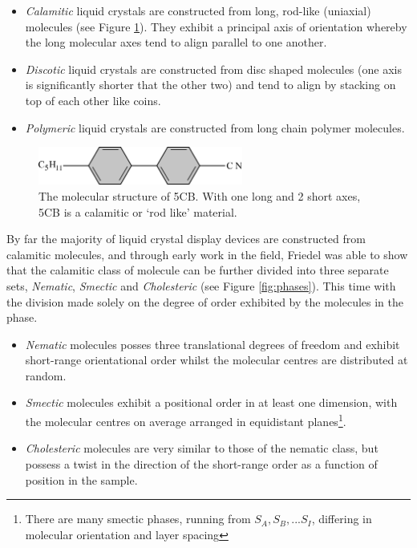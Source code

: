 \begin{itemize}
\item \textit{Calamitic} liquid crystals are constructed from long, rod-like (uniaxial) molecules (see Figure \ref{fig:5cb_molecule}). They exhibit a principal axis of orientation whereby the long molecular axes tend to align parallel to one another.
\item \textit{Discotic} liquid crystals are constructed from disc shaped molecules (one axis is significantly shorter that the other two) and tend to align by stacking on top of each other like coins.
\item \textit{Polymeric} liquid crystals are constructed from long chain polymer molecules.
\end{itemize}

\begin{figure}
\begin{center}
\includegraphics[width=0.6\textwidth]{figures/introduction/5CB_molecule.pdf}
\end{center}
\caption[The molecular structure of 5CB]{\label{fig:5cb_molecule} The molecular structure of 5CB. With one long and 2 short axes, 5CB is a calamitic or `rod like' material.}
\end{figure}

By far the majority of liquid crystal display devices are constructed from calamitic molecules, and through early work in the field, Friedel  \cite{Friedel1922} was able to show that the calamitic class of molecule can be further divided into three separate sets, \textit{Nematic}, \textit{Smectic} and \textit{Cholesteric} (see Figure \ref{fig:phases}). This time with the division made solely on the degree of order exhibited by the molecules in the phase.

\begin{itemize}
\item \textit{Nematic} molecules posses three translational degrees of freedom and exhibit short-range orientational order whilst the molecular centres are distributed at random.
\item \textit{Smectic} molecules exhibit a positional order in at least one dimension, with the molecular centres on average arranged in equidistant planes\footnote{There are many smectic phases, running from $S_A,S_B,...S_I$, differing in molecular orientation and layer spacing}.
\item \textit{Cholesteric} molecules are very similar to those of the nematic class, but possess a twist in the direction of the short-range order as a function of position in the sample. 
\end{itemize}


